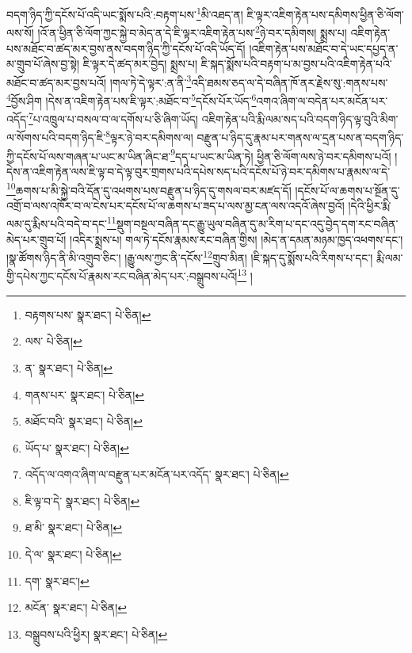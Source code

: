 བདག་ཉིད་ཀྱི་དངོས་པོ་འདི་ཡང་སྨོས་པའི་:བརྟག་པས་\footnote{བརྟགས་པས་  སྣར་ཐང་།  པེ་ཅིན། }མི་འཐད་ན། ཇི་ལྟར་འཇིག་རྟེན་པས་དམིགས་ཕྱིན་ཅི་ལོག་ལས་སོ། །འོ་ན་ཕྱིན་ཅི་ལོག་ཀྱང་སྐྱེ་བ་མེད་ན་དེ་ཇི་ལྟར་འཇིག་རྟེན་པས་\footnote{ལས་  པེ་ཅིན། }ཉེ་བར་དམིགས། སྨྲས་པ། འཇིག་རྟེན་པས་མཐོང་བ་ཚད་མར་བྱས་ནས་བདག་ཉིད་ཀྱི་དངོས་པོ་འདི་ཡོད་དོ། །འཇིག་རྟེན་པས་མཐོང་བ་དེ་ཡང་དཔྱད་ན་མ་གྲུབ་པོ་ཞེས་བྱ་སྟེ། ཇི་ལྟར་དེ་ཚད་མར་བྱེད། སྨྲས་པ། ཇི་སྐད་སྨོས་པའི་བརྟག་པ་མ་བྱས་པའི་འཇིག་རྟེན་པའི་མཐོང་བ་ཚད་མར་བྱས་པའོ། །གལ་ཏེ་དེ་ལྟར་:ན་ནི་\footnote{ན་  སྣར་ཐང་།  པེ་ཅིན། }འདི་ཐམས་ཅད་ལ་དེ་བཞིན་ཁོ་ནར་རྗེས་སུ་:གནས་པས་\footnote{གནས་པར་  སྣར་ཐང་།  པེ་ཅིན། }བྱོས་ཤིག །དེས་ན་འཇིག་རྟེན་པས་ཇི་ལྟར་:མཐོང་བ་\footnote{མཐོང་བའི་  སྣར་ཐང་།  པེ་ཅིན། }དངོས་པོར་ཡོད་\footnote{ཡོད་པ་  སྣར་ཐང་།  པེ་ཅིན། }འགའ་ཞིག་ལ་བདེན་པར་མངོན་པར་འདོད་\footnote{འདོད་ལ་འགའ་ཞིག་ལ་བརྫུན་པར་མངོན་པར་འདོད་  སྣར་ཐང་།  པེ་ཅིན། }པ་འཁྲུལ་པ་བསལ་བ་ལ་དགོས་པ་ཅི་ཞིག་ཡོད། འཇིག་རྟེན་པའི་རྨི་ལམ་སད་པའི་བདག་ཉིད་ལྟ་བུའི་མིག་ལ་སོགས་པའི་བདག་ཉིད་ཇི་\footnote{ཇི་ལྟ་བ་དེ་  སྣར་ཐང་།  པེ་ཅིན། }ལྟར་ཉེ་བར་དམིགས་ལ། བརྫུན་པ་ཉིད་དུ་རྣམ་པར་གནས་ལ་དྲན་པས་ན་བདག་ཉིད་ཀྱི་དངོས་པོ་ལས་གཞན་པ་ཡང་མ་ཡིན་ཞིང་ཐ་\footnote{ཐ་མི་  སྣར་ཐང་།  པེ་ཅིན། }དད་པ་ཡང་མ་ཡིན་ཏེ། ཕྱིན་ཅི་ལོག་ལས་ཉེ་བར་དམིགས་པའོ། །དེས་ན་འཇིག་རྟེན་ལས་ཇི་ལྟ་བ་དེ་ལྟ་བུར་གྲགས་པའི་དཔེས་སད་པའི་དངོས་པོ་ཉེ་བར་དམིགས་པ་རྣམས་ལ་དེ་\footnote{དེ་ལ་  སྣར་ཐང་།  པེ་ཅིན། }ཆགས་པ་མི་སྐྱེ་བའི་དོན་དུ་འཕགས་པས་བརྫུན་པ་ཉིད་དུ་གསལ་བར་མཛད་དོ། །དངོས་པོ་ལ་ཆགས་པ་སྔོན་དུ་འགྲོ་བ་ལས་འཁོར་བ་ལ་ངེས་པར་དངོས་པོ་ལ་ཆགས་པ་ཟད་པ་ལས་མྱ་ངན་ལས་འདའོ་ཞེས་བྱའོ། །དེའི་ཕྱིར་རྨི་ལམ་དུ་རྨིས་པའི་བདེ་བ་དང་\footnote{དག་  སྣར་ཐང་། }སྡུག་བསྔལ་བཞིན་དང་རྒྱུ་ཡུལ་བཞིན་དུ་མ་རིག་པ་དང་འདུ་བྱེད་དག་རང་བཞིན་མེད་པར་གྲུབ་པོ། །འདིར་སྨྲས་པ། གལ་ཏེ་དངོས་རྣམས་རང་བཞིན་གྱིས། །མེད་ན་དམན་མཉམ་ཁྱད་འཕགས་དང་། །སྣ་ཚོགས་ཉིད་ནི་མི་འགྲུབ་ཅིང་། །རྒྱུ་ལས་ཀྱང་ནི་དངོས་\footnote{མངོན་  སྣར་ཐང་།  པེ་ཅིན། }གྲུབ་མིན། །ཇི་སྐད་དུ་སྨོས་པའི་རིགས་པ་དང་། རྨི་ལམ་གྱི་དཔེས་ཀྱང་དངོས་པོ་རྣམས་རང་བཞིན་མེད་པར་:བསྒྲུབས་པའོ།\footnote{བསྒྲུབས་པའི་ཕྱིར།  སྣར་ཐང་།  པེ་ཅིན། } །
